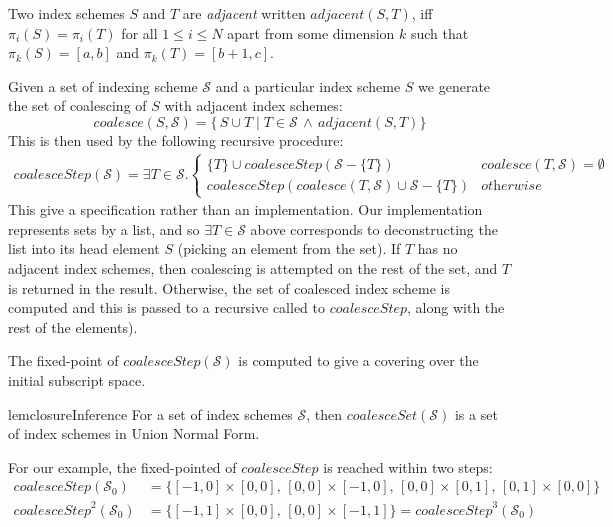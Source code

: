 \newcommand{\contig}[2]{\mathit{adjacent}(#1, #2)}
\begin{defn}[Adjacent]
  \label{def:contiguity}
  Two index schemes $S$ and $T$ are \emph{adjacent} written
  $\contig{S}{T}$, iff $\pi_i(S) = \pi_i(T)$ for all $1 \leq i \leq N$
  apart from some dimension $k$ such that $\pi_k(S) = [a, b]$ and
  $\pi_k(T) = [b+1, c]$.
\end{defn}
%
Given a set of indexing scheme $\mathcal{S}$ and a particular index scheme $S$
we generate the set of coalescing of $S$ with adjacent index schemes:
%
\begin{equation*}
\mathit{coalesce}(S, \mathcal{S}) = 
  \{\,S \cup T \mid T \in \mathcal{S} \, \wedge \,
  \contig{S}{T} \}
\end{equation*}
%
This is then used by the following recursive procedure:
%
\begin{align*}
  \mathit{coalesceStep}(\mathcal{S}) =
  \exists T \in \mathcal{S} . 
  \begin{cases}
    \{T\} \cup \mathit{coalesceStep}(\mathcal{S} - \{T\}) &
    \mathit{coalesce}(T, \mathcal{S}) = \emptyset \\
    \mathit{coalesceStep}(\mathit{coalesce}(T, \mathcal{S}) \cup
                                        \mathcal{S} - \{T\}) & \textit{otherwise}
  \end{cases}
\end{align*}
%
This give a specification rather than an implementation. Our
implementation represents sets by a list, and so
$\exists T \in \mathcal{S}$ above corresponds to deconstructing
the list into its head element $S$ (picking an element from the set).
If $T$ has no adjacent index schemes, then coalescing is attempted on
the rest of the set, and $T$ is returned in the result. Otherwise,
the set of coalesced index scheme is computed and this is passed to
a recursive called to $\mathit{coalesceStep}$, along with the rest of
the elements).

The fixed-point of $\textit{coalesceStep}(\mathcal{S})$ is computed to
give a covering over the initial subscript space.
%
\begin{restatable}{lem}{closureInference}
  \label{lem:closuer-inference}
  For a set of index schemes $\mathcal{S}$, then
  $\mathit{coalesceSet}(\mathcal{S})$ is a set of
  index schemes in Union Normal Form.
\end{restatable}
%
For our example, the fixed-pointed of $\mathit{coalesceStep}$ is reached within two
steps:
%
\begin{align*}
  \mathit{coalesceStep}(\mathcal{S}_0) & =
  \{[-1,0] \times [0,0],\,[0,0] \times [-1, 0],\,[0,0] \times
    [0,1],\,[0,1] \times [0,0]\} \\
  \mathit{coalesceStep}^2(\mathcal{S}_0) & =
  \{[-1, 1] \times [0, 0],\,[0, 0] \times [-1, 1]\} = \mathit{coalesceStep}^3(\mathcal{S}_0)
\end{align*}
%

